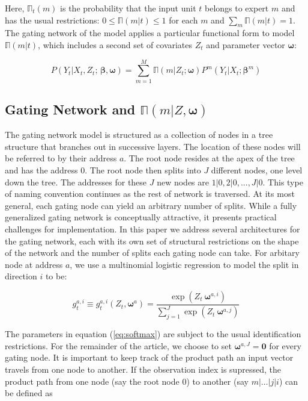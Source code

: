 \documentclass[12pt]{article}
\newcommand{\expmixwt}[0]{\mathbb{\Pi}}
\begin{document}
Here, $\expmixwt_{t}(m)$ is the probability that the input unit $t$ belongs
to expert $m$ and has the usual restrictions: $0 \leq \expmixwt(m|t) \leq 1$
for each $m$ and $\sum_{m} \expmixwt(m|t) = 1$. The gating network of the model
applies a particular functional form to model $\expmixwt(m|t)$, which includes a
second set of covariates $Z_{t}$ and parameter vector $\boldsymbol{\omega}$:

\begin{equation} \label{eq:mixture}
  P(Y_{t} | X_{t}, Z_{t}; \, \boldsymbol{\beta}, \boldsymbol{\omega}) = \sum_{m=1}^{M} \expmixwt(m | Z_{t}; \boldsymbol{\omega}) P^{m}(Y_{t} | X_{t}; \boldsymbol{\beta}^{m})
\end{equation}


\subsection{Gating Network and $\expmixwt(m | Z, \boldsymbol{\omega})$} \label{subsec:GatingNetwork}

The gating network model is structured as a collection of nodes in a tree
structure that branches out in successive layers. The location of these nodes will
be referred to by their address $a$. The root node resides at the apex of the tree
and has the address $0$. The root node then splits into $J$ different nodes,
one level down the tree. The addresses for these $J$ new nodes are 
$1|0, 2|0, ..., J|0$. This type of naming convention continues as the
rest of network is traversed. At its most general, each gating node can yield an
arbitrary number of splits. While a fully generalized gating network is
conceptually attractive, it presents practical challenges for implementation.
In this paper we address several architectures for the gating network, each
with its own set of structural restrictions on the shape of the network and
the number of splits each gating node can take. For arbitary node at address $a$,
we use a multinomial logistic regression to model the split in direction $i$ to be:

\begin{equation} \label{eq:softmax}
  g^{a,i}_{t} \equiv g^{a,i}_{t}(Z_{t}, \boldsymbol{\omega}^{a}) = \frac{\exp(Z_{t} \ \boldsymbol{\omega}^{a,i})}{\sum^{J}_{j=1} {\exp(Z_{t} \ \boldsymbol{\omega}^{a,j})}}
\end{equation}

The parameters in equation (\ref{eq:softmax}) are subject to the usual
identification restrictions. For the remainder of the article, we choose
to set $\boldsymbol{\omega}^{a,J} = \boldsymbol{0}$ for every gating node.
It is important to keep track of the product path an input vector travels from
one node to another. If the observation index is supressed, the product path
from one node (say the root node $0$) to another (say $m|\ldots|j|i$)
can be defined as
\end{document}
